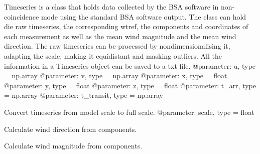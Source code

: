 \documentclass[letterpaper,10pt,english]{sphinxmanual}
\begin{document}

\begin{fulllineitems}
\label{\detokenize{index:windtunnel.Timeseries_nc}}
Timeseries is a class that holds data collected by the BSA software in
non-coincidence mode using the standard BSA software output. The class can
hold die raw timeseries, the corresponding wtref, the components and 
coordinates of each measurement as well as the mean wind magnitude and the
mean wind direction. The raw timeseries can be processed by 
nondimensionalising it, adapting the scale, making it equidistant and 
masking outliers. All the information in a Timeseries object can be saved
to a txt file.
@parameter: u, type = np.array
@parameter: v, type = np.array
@parameter: x, type = float
@parameter: y, type = float
@parameter: z, type = float
@parameter: t\_arr, type = np.array
@parameter: t\_transit, type = np.array

\begin{fulllineitems}
\label{\detokenize{index:windtunnel.Timeseries_nc.adapt_scale}}
Convert timeseries from model scale to full scale.
@parameter: scale, type = float

\end{fulllineitems}


\begin{fulllineitems}
\label{\detokenize{index:windtunnel.Timeseries_nc.calc_direction}}
Calculate wind direction from components.

\end{fulllineitems}


\begin{fulllineitems}
\label{\detokenize{index:windtunnel.Timeseries_nc.calc_magnitude}}
Calculate wind magnitude from components.


\end{fulllineitems}
\end{fulllineitems}
\end{document}
